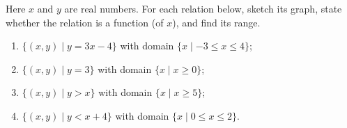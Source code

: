 Here $x$ and $y$ are real numbers. For each relation below, sketch its graph, state whether the relation is a function (of $x$), and find its range.
\begin{enumerate}
\item[(a)] $\{(x,y)\mid y=3x-4\}$ with domain $\{x\mid -3\le x\le4\}$;
\item[(b)] $\{(x,y)\mid y=3\}$ with domain $\{x\mid x\ge0\}$;
\item[(c)] $\{(x,y)\mid y>x\}$ with domain $\{x\mid x\ge5\}$;
\item[(d)] $\{(x,y)\mid y<x+4\}$ with domain $\{x\mid 0\le x\le2\}$.
\end{enumerate}
